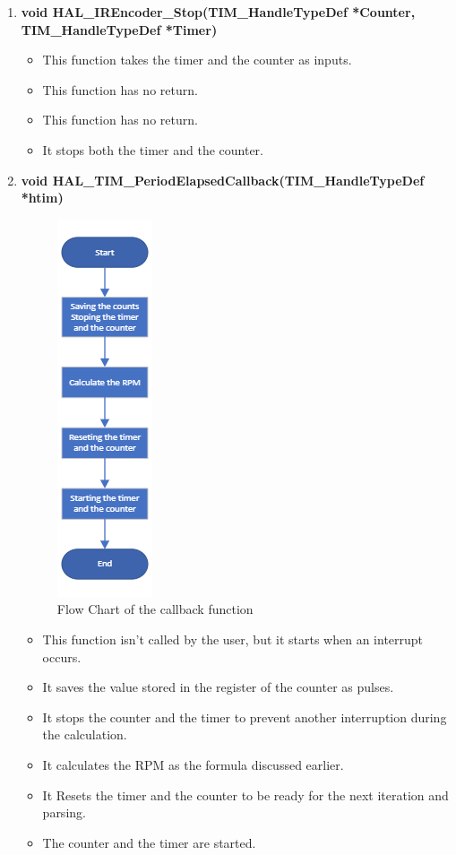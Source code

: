 \begin{enumerate}
     \item \textbf{void HAL\_IREncoder\_Stop(TIM\_HandleTypeDef *Counter, \\TIM\_HandleTypeDef *Timer)}
    \begin{itemize}
        \item This function takes the timer and the counter as inputs.
        \item This function has no return.
        \item This function has no return.
        \item It stops both the timer and the counter.
    \end{itemize}
    \clearpage
    \item \textbf{void HAL\_TIM\_PeriodElapsedCallback(TIM\_HandleTypeDef *htim)}
    \begin{figure}[h]
        \centering
        \includegraphics[scale=.6]{figuresEncoder/12.png}
        \caption{Flow Chart of the callback function}
    \end{figure}
    \begin{itemize}
        \item This function isn’t called by the user, but it starts when an interrupt occurs.
        \item It saves the value stored in the register of the counter as pulses.
        \item It stops the counter and the timer to prevent another interruption during the calculation.
        \item It calculates the RPM as the formula discussed earlier.
        \item It Resets the timer and the counter to be ready for the next iteration and parsing.
        \item The counter and the timer are started.
    \end{itemize}
    
\end{enumerate}

